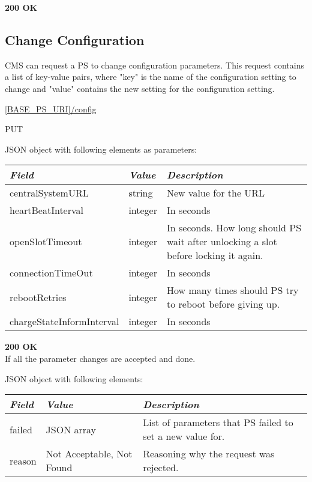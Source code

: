 \textbf{200 OK}


\subsection{Change Configuration}
\label{cms:change-conf}

\acs{CMS} can request a \acs{PS} to change configuration parameters. This request contains a list of key-value pairs, where "key" is the name of the configuration setting to change and "value" contains the new setting for the configuration setting.

 \url{[BASE_PS_URI]/config}

 PUT

JSON object with following elements as parameters:\\
\begin{tabularx}{\linewidth}{ | l | l | X | }
  \hline
  \textit{Field} & \textit{Value} &\textit{Description} \\
  \hline \hline
  centralSystemURL 			& string 		& New value for the URL \\
  heartBeatInterval 			& integer 		& In seconds \\
  openSlotTimeout 			& integer 		& In seconds. How long should \acs{PS} wait after unlocking a slot before locking it again. \\
  connectionTimeOut 			& integer 		& In seconds \\
  rebootRetries 				& integer 		& How many times should \acs{PS} try to reboot before giving up.\\
  chargeStateInformInterval 	& integer 		& In seconds \\
  \hline
\end{tabularx}

\textbf{200 OK}\\ If all the parameter changes are accepted and done.

JSON object with following elements:\\
\begin{tabularx}{\linewidth}{ | l | l | X | }
  \hline
  \textit{Field} & \textit{Value} & \textit{Description} \\
  \hline \hline
  failed			& JSON array & List of parameters that \acs{PS} failed to set a new value for.\\
  reason 		& Not Acceptable, Not Found & Reasoning why the request was rejected.\\
  \hline
\end{tabularx}

